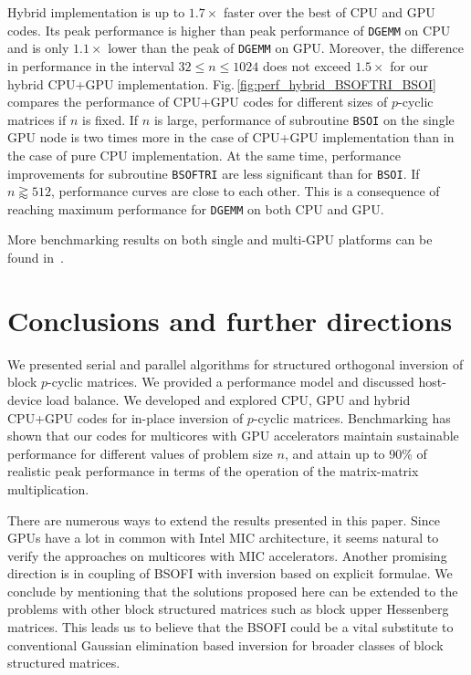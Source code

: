 \documentclass{llncs}
\newcommand{\Bsoftri}{\texttt{BSOFTRI}\xspace}
\newcommand{\Bsoi}{\texttt{BSOI}\xspace}
\newcommand{\Gemm}{\texttt{DGEMM}\xspace}
\begin{document}
%
Hybrid implementation is up to $1.7\times$ faster over the 
best of CPU and GPU codes.
Its peak performance is higher than peak 
performance of \Gemm on CPU 
and is only $1.1\times$ lower than the peak of \Gemm on GPU.
Moreover, 
the difference in performance in the interval $32 \leq n \leq 1024$ 
does not exceed $1.5\times$ for our hybrid CPU+GPU implementation. %
Fig.\,\ref{fig:perf_hybrid_BSOFTRI_BSOI}
compares 
the performance of CPU+GPU codes for different sizes of $p$-cyclic matrices if $n$ is fixed. 
If $n$ is large, performance of subroutine \Bsoi on the single GPU node 
is two times more in the case of CPU+GPU implementation  
than in the case of pure CPU implementation.
At the same time, 
performance improvements for subroutine \Bsoftri 
are less significant than for \Bsoi.
If $n \gtrapprox 512$, performance curves are close to each other. 
This is a consequence of reaching maximum performance for \Gemm
on both CPU and GPU. 

More benchmarking results on both single and multi-GPU platforms 
can be found in~\cite{GogolenkoBai13}.

\section{Conclusions and further directions}
\label{sec:conclusions}

We presented serial and parallel algorithms for structured orthogonal inversion
of block $p$-cyclic matrices.
We provided a performance model and discussed host-device load balance.
We developed and explored CPU, GPU and hybrid CPU+GPU codes
for in-place inversion of $p$-cyclic matrices.
Benchmarking has shown that 
our codes for multicores with GPU accelerators
maintain sustainable performance for different values 
of problem size $n$, and attain up to 90\% of realistic peak performance in 
terms of the operation of the matrix-matrix multiplication. 

There are numerous ways to extend the results presented in this paper.
Since GPUs have a lot in common with Intel MIC architecture, 
it seems natural to verify the approaches
on multicores with MIC accelerators.
Another promising direction is in coupling of 
BSOFI with inversion based on explicit formulae. 
We conclude by mentioning 
that the solutions proposed here can be extended to 
the problems with other block structured matrices such as
block upper Hessenberg matrices. 
This leads us to believe that the BSOFI could be a vital substitute 
to conventional Gaussian elimination based inversion
for broader classes of block structured matrices.



\end{document}

